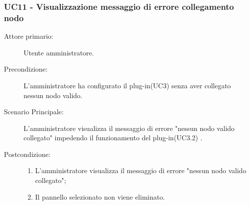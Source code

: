 \subsubsection{UC11 - Visualizzazione messaggio di errore collegamento nodo}
\label{sssec:uc11}
\begin{description}
	\item[Attore primario:] Utente amministratore.
	\item[Precondizione:] L'amministratore ha configurato il plug-in(UC3) senza aver collegato nessun nodo valido.
	\item[Scenario Principale:] L'amministratore visualizza il messaggio di errore "nessun nodo valido collegato" impedendo il funzionamento del plug-in(UC3.2) .
	\item[Postcondizione:]
	\begin{enumerate}
		\item L'amministratore visualizza il messaggio di errore "nessun nodo valido collegato";
		\item Il pannello selezionato non viene eliminato.
	\end{enumerate}
\end{description}